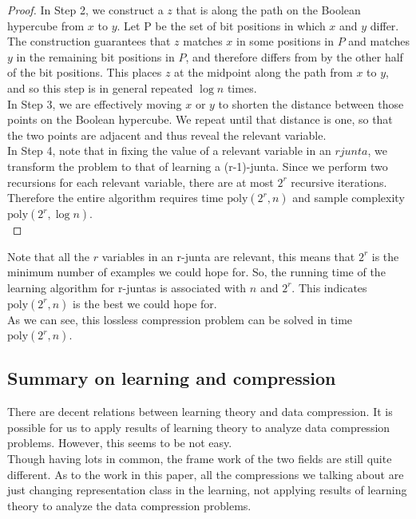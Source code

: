 \documentclass[12pt]{article}
\newcommand{\poly}{\mathrm{poly}}
\begin{document}
\begin{proof}
In Step 2, we construct a $z$ that is along the path on the Boolean hypercube from $x$ to $y$. Let P be the set of bit positions in which $x$ and $y$ differ. The construction guarantees that $z$ matches $x$ in some positions in $P$ and matches $y$ in the remaining bit positions in $P$, and therefore differs from by the other half of the bit positions. This places $z$ at the midpoint along the path from $x$ to $y$, and so this step is in general repeated $\log n$ times. \\

In Step 3, we are effectively moving $x$ or $y$ to shorten the distance between those points on the Boolean hypercube. We repeat until that distance is one, so that the two points are adjacent and thus reveal the relevant variable. \\

In Step 4, note that in fixing the value of a relevant variable in an $rjunta$, we transform the problem to that of learning a (r-1)-junta. Since we perform two recursions for each relevant variable, there are at most $2^r$ recursive iterations. Therefore the entire algorithm requires time $\poly (2^r, n)$ and sample complexity $\poly (2^r, \log n)$. \\
\end{proof}

Note that all the $r$ variables in an r-junta are relevant, this means that $2^r$ is the minimum number of examples we could hope for. So, the running time of the learning algorithm for r-juntas is associated with $n$ and $2^r$. This indicates $\poly (2^r, n)$ is the best we could hope for. \\

As we can see, this lossless compression problem can be solved in time $\poly (2^r, n)$.

\subsection{Summary on learning and compression}


There are decent relations between learning theory and data compression. It is possible for us to apply results of learning theory to analyze data compression problems. However, this seems to be not easy. \\

Though having lots in common, the frame work of the two fields are still quite different. As to the work in this paper, all the compressions we talking about are just changing representation class in the learning, not applying results of learning theory to analyze the data compression problems. \\
\end{document}
